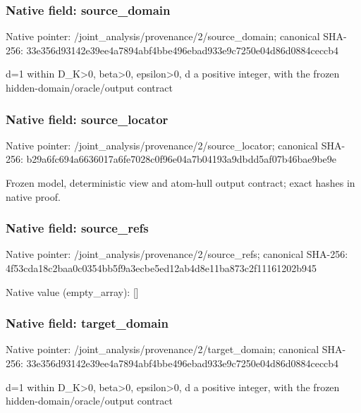 \documentclass[10pt,a4paper]{article}
\begin{document}
\subsubsection{Native field: source\_\allowbreak{}domain}
Native pointer: /joint\_\allowbreak{}analysis/provenance/2/source\_\allowbreak{}domain; canonical SHA-256: 33e356d93142e39ee4a7894abf4bbe496ebad933e9c7250e04d86d0884ceccb4

\begingroup\raggedright\sloppy d=\allowbreak{}1 within D\_\allowbreak{}K>0,\allowbreak{} beta>0,\allowbreak{} epsilon>0,\allowbreak{} d a positive integer,\allowbreak{} with the frozen hidden-domain/\allowbreak{}oracle/\allowbreak{}output contract\par\endgroup

\subsubsection{Native field: source\_\allowbreak{}locator}
Native pointer: /joint\_\allowbreak{}analysis/provenance/2/source\_\allowbreak{}locator; canonical SHA-256: b29a6fc694a6636017a6fe7028c0f96e04a7b04193a9dbdd5af07b46bae9be9e

\begingroup\raggedright\sloppy Frozen model,\allowbreak{} deterministic view and atom-hull output contract;\allowbreak{} exact hashes in native proof.\par\endgroup

\subsubsection{Native field: source\_\allowbreak{}refs}
Native pointer: /joint\_\allowbreak{}analysis/provenance/2/source\_\allowbreak{}refs; canonical SHA-256: 4f53cda18c2baa0c0354bb5f9a3ecbe5ed12ab4d8e11ba873c2f11161202b945

Native value (empty\_\allowbreak{}array): []

\subsubsection{Native field: target\_\allowbreak{}domain}
Native pointer: /joint\_\allowbreak{}analysis/provenance/2/target\_\allowbreak{}domain; canonical SHA-256: 33e356d93142e39ee4a7894abf4bbe496ebad933e9c7250e04d86d0884ceccb4

\begingroup\raggedright\sloppy d=\allowbreak{}1 within D\_\allowbreak{}K>0,\allowbreak{} beta>0,\allowbreak{} epsilon>0,\allowbreak{} d a positive integer,\allowbreak{} with the frozen hidden-domain/\allowbreak{}oracle/\allowbreak{}output contract\par\endgroup
\end{document}

